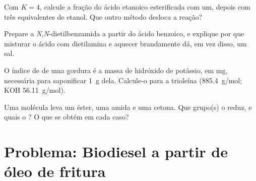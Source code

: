 \begin{exercise}[$\star\star$]\label{exo:b2:acyl-substitution:9}
Com $K = 4$, calcule a fração do ácido etanoico esterificada com um, depois com três
equivalentes de etanol. Que outro método desloca a reação?
\end{exercise}

\begin{exercise}[$\star\star\star$]\label{exo:b2:acyl-substitution:10}
Prepare a \textit{N},\textit{N}-dietilbenzamida a partir do ácido benzoico, e explique por que
misturar o ácido com dietilamina e aquecer brandamente dá, em vez disso, um sal.
\end{exercise}

\begin{exercise}[$\star\star\star$]\label{exo:b2:acyl-substitution:11}
O índice de  de uma gordura é a massa de hidróxido de potássio, em mg, necessária
para saponificar \qty{1}{g} dela. Calcule-o para a trioleína (\qty{885.4}{g/mol}; KOH \qty{56.11}{g/mol}).
\end{exercise}

\begin{exercise}[$\star\star\star$]\label{exo:b2:acyl-substitution:12}
Uma molécula leva um éster, uma amida e uma cetona. Que grupo(s) o  reduz, e quais o
? O que se obtém em cada caso?
\end{exercise}

\section{Problema: Biodiesel a partir de óleo de fritura}

